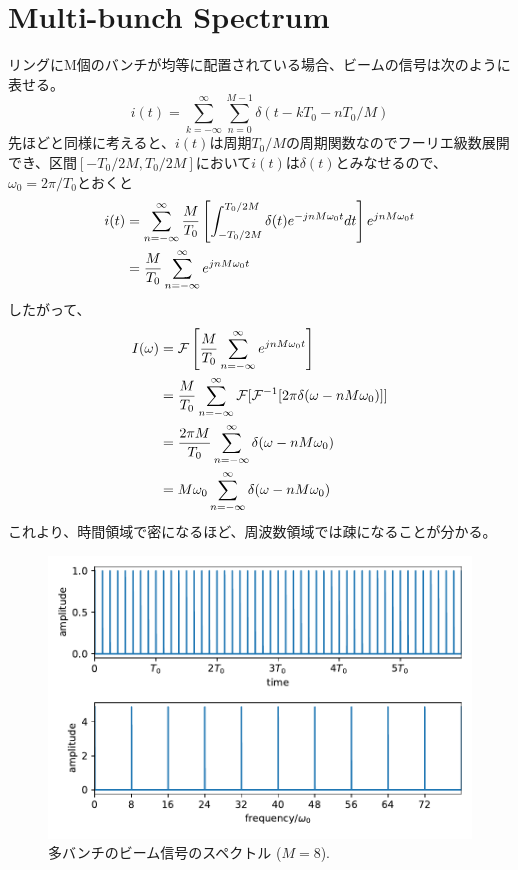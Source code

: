 \documentclass[]{jlreq}
\theoremstyle{definition}
\begin{document}
\section{Multi-bunch Spectrum}
リングにM個のバンチが均等に配置されている場合、ビームの信号は次のように表せる。
%
\begin{equation}
  i(t) = \sum_{k=-\infty}^{\infty} \sum_{n=0}^{M-1}\delta (t - k T_0 -n T_0 / M)
\end{equation}
%
先ほどと同様に考えると、$i(t)$は周期$T_0/M$の周期関数なのでフーリエ級数展開でき、区間$[-T_0/2M, T_0/2M]$において$i(t)$は$\delta(t)$とみなせるので、$\omega_0 = 2\pi/T_0$とおくと
%
\begin{align}
  i(t) &= \sum_{n = -\infty}^{\infty} \frac{M}{T_0} \left[\int_{-T_0/2M}^{T_0/2M}\delta (t) e^{-j n M \omega_0 t} dt\right] 
  e^{j n M \omega_0 t} \notag\\
              &= \frac{M}{T_0} \sum_{n = -\infty}^{\infty} e^{j n M \omega_0 t} 
\end{align}
%
したがって、
%
\begin{align}
  I(\omega)  &= \mathcal{F}\left[\frac{M}{T_0} \sum_{n = -\infty}^{\infty} e^{j n M \omega_0 t}\right]\notag \\ 
      & = \frac{M}{T_0} \sum_{n = -\infty}^{\infty} \mathcal{F}[\mathcal{F}^{-1}[2\pi \delta(\omega - n M \omega_0)]]\notag \\ 
      & = \frac{2 \pi M}{T_0} \sum_{n = -\infty}^{\infty} \delta(\omega - n M \omega_0)\notag\\ 
      &= M \omega_0 \sum_{n = -\infty}^{\infty} \delta(\omega - n M \omega_0)
\end{align}
%
これより、時間領域で密になるほど、周波数領域では疎になることが分かる。
%
\begin{figure}[hbt]
  \begin{center}
    \includegraphics[width=12cm,clip]{multi_bunch.pdf}
    \caption{多バンチのビーム信号のスペクトル ($M=8$).}
   \label{multi_bunch}
  \end{center}
\end{figure}
%
\end{document}
